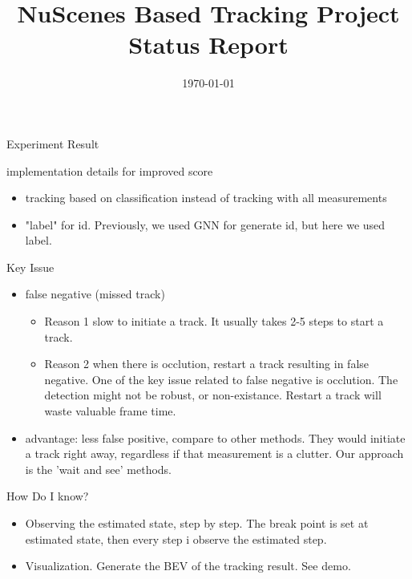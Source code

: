 \documentclass[aspectratio=169,xcolor=dvipsnames]{beamer}
\title{NuScenes Based Tracking Project Status Report} %
\date{\today} %
\begin{document}
\begin{frame}
    \titlepage
\end{frame}

\begin{frame}{Experiment Result}
    \href{https://docs.google.com/spreadsheets/d/e/2PACX-1vQg2MSCst4ShlC0e7T_lr_q4azo-DfDo53On89BjeisHAKJrggMLoTUxcvurpXomLZilYKoWmMMf6U4/pubhtml}{}
    \href{https://motchallenge.net/results/CVPR_2019_Tracking_Challenge/}{}
\end{frame}

\begin{frame}{implementation details for improved score}
    \begin{itemize}
        \item{tracking based on classification instead of tracking with all measurements}
        \item{"label" for id. Previously, we used GNN for generate id, but here we used label.}
    \end{itemize}
\end{frame}

\begin{frame}{Key Issue}
    \begin{itemize}
        \item{false negative (missed track)}
        \begin{itemize}
            \item{Reason 1 slow to initiate a track. It usually takes 2-5 steps to start a track. }
            \item{Reason 2 when there is occlution, restart a track resulting in false negative. One of the key issue related to false negative is occlution. The detection might not be robust, or non-existance. Restart a track will waste valuable frame time. }
        \end{itemize}
        \item{advantage: less false positive, compare to other methods. They would initiate a track right away, regardless if that measurement is a clutter. Our approach is the 'wait and see' methods.}
    \end{itemize}
\end{frame}

\begin{frame}{How Do I know?}
    \begin{itemize}
        \item{Observing the estimated state, step by step. The break point is set at estimated state, then every step i observe the estimated step.}
        \item{Visualization. Generate the BEV of the tracking result. See demo. }
    \end{itemize}
\end{frame}
\end{document}
